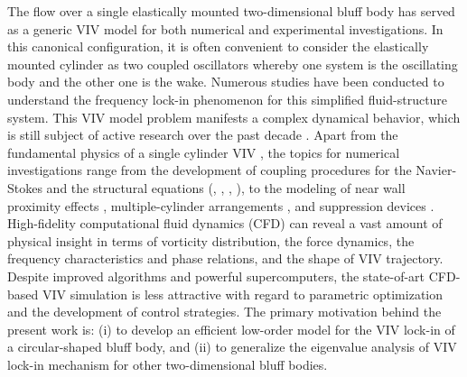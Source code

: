 \documentclass{jfm}
\begin{document}
The flow over a single elastically  mounted two-dimensional bluff body has served as a 
generic VIV model for both numerical and experimental investigations.
%
In this canonical configuration, it is often convenient to consider the elastically mounted 
cylinder as two coupled oscillators whereby one system is the oscillating body and the other one is 
the wake.
%
Numerous studies have been conducted to understand the frequency lock-in phenomenon 
for this simplified fluid-structure system. This VIV model problem 
manifests a complex dynamical behavior, which is still subject of active research 
over the past decade \citep{williamson2004,bearman2011}.
%
Apart from the fundamental physics 
of a single cylinder VIV \citep{Blackburn1999,Shiels2001,Singh2005,Leontini2006}, 
the topics for numerical investigations range from the development of coupling procedures for 
the Navier-Stokes and the structural equations 
(\cite{He2012}, \cite{Jaiman2015}, \cite{Jaiman2016a}, \cite{Jaiman2016b}), 
to the modeling of near wall proximity effects \citep{Tham2015}, 
multiple-cylinder arrangements \citep{Mysa2016,Liubin2016}, 
and suppression devices \citep{Yu2015,Law2017}. 
High-fidelity computational fluid dynamics (CFD) can reveal a vast amount of 
physical insight in terms of vorticity distribution, the force dynamics, 
the frequency characteristics and phase relations, 
and the shape of VIV trajectory. Despite improved algorithms and powerful supercomputers,
the state-of-art CFD-based VIV simulation 
is less attractive with regard to parametric optimization 
and the development of control strategies.
%
The primary motivation behind the present work is: 
(i) to develop an efficient low-order model for the VIV lock-in of
a circular-shaped bluff body, and (ii) to generalize the eigenvalue analysis of 
VIV lock-in mechanism for other two-dimensional bluff bodies.
\end{document}
